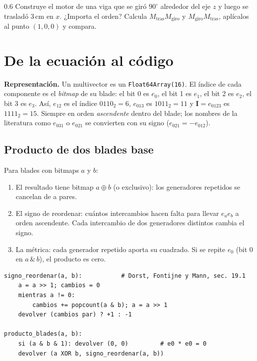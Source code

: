 \documentclass[11pt,a4paper]{article}
\numberwithin{equation}{section}
\newcommand{\I}{\mathbf{I}}
\begin{document}
\begin{ejercicio}{0.6}
Construye el motor de una viga que se giró $90^\circ$ alrededor del eje $z$ y luego se trasladó 3\,cm en $x$.
¿Importa el orden? Calcula $M_{\text{tras}}M_{\text{giro}}$ y $M_{\text{giro}}M_{\text{tras}}$, aplícalos al punto
$(1,0,0)$ y compara.
\end{ejercicio}

\section{De la ecuación al código}

\begin{codigo}
\textbf{Representación.} Un multivector es un \texttt{Float64Array(16)}. El índice de cada componente es el
\emph{bitmap} de su blade: el bit 0 es $e_0$, el bit 1 es $e_1$, el bit 2 es $e_2$, el bit 3 es $e_3$. Así,
$e_{12}$ es el índice $0110_2 = 6$, $e_{013}$ es $1011_2 = 11$ y $\I = e_{0123}$ es $1111_2 = 15$. Siempre en orden
\emph{ascendente} dentro del blade; los nombres de la literatura como $e_{031}$ o $e_{021}$ se convierten con su signo
($e_{021} = -e_{012}$).
\end{codigo}

\subsection{Producto de dos blades base}
Para blades con bitmaps $a$ y $b$:
\begin{enumerate}[leftmargin=*]
  \item El resultado tiene bitmap $a \oplus b$ (o exclusivo): los generadores repetidos se cancelan de a pares.
  \item El signo de reordenar: cuántos intercambios hacen falta para llevar $e_ae_b$ a orden ascendente. Cada
        intercambio de dos generadores distintos cambia el signo.
  \item La métrica: cada generador repetido aporta su cuadrado. Si se repite $e_0$ (bit 0 en $a \,\&\, b$), el
        producto es cero.
\end{enumerate}

\begin{lstlisting}
signo_reordenar(a, b):           # Dorst, Fontijne y Mann, sec. 19.1
    a = a >> 1; cambios = 0
    mientras a != 0:
        cambios += popcount(a & b); a = a >> 1
    devolver (cambios par) ? +1 : -1

producto_blades(a, b):
    si (a & b & 1): devolver (0, 0)         # e0 * e0 = 0
    devolver (a XOR b, signo_reordenar(a, b))
\end{lstlisting}
\end{document}
